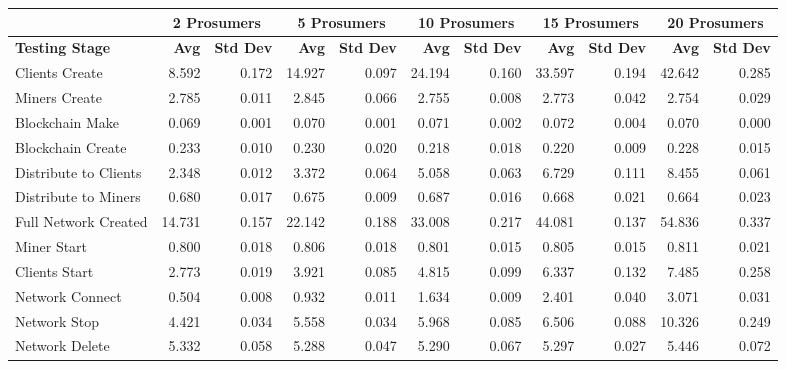 \begin{tabular}{ l  r  r  r  r  r  r  r  r  r  r  } \hline

	&	\multicolumn{2}{c}{\textbf{2 Prosumers}}  	&	\multicolumn{2}{c}{\textbf{5 Prosumers}}	&	 \multicolumn{2}{c}{\textbf{10 Prosumers}}	&	\multicolumn{2}{c}{\textbf{15 Prosumers}} 	&	 \multicolumn{2}{c}{\textbf{20 Prosumers}}		\\ \hline

\textbf{Testing Stage}	&	\textbf{Avg} 	&	\textbf{Std Dev} 	&	\textbf{Avg} 	&	\textbf{Std Dev} 	&	\textbf{Avg} 	&	\textbf{Std Dev } 	&	\textbf{Avg} 	&	\textbf{Std Dev} 	&	\textbf{Avg} 	&	\textbf{Std Dev} 	\\ \hline


Clients Create	&	8.592 	&	0.172 	&	14.927 	&	0.097 	&	24.194 	&	0.160 	&	33.597 	&	0.194 	&	42.642 	&	0.285 	\\ \hline
Miners Create 	&	2.785 	&	0.011 	&	2.845 	&	0.066 	&	2.755 	&	0.008 	&	2.773 	&	0.042 	&	2.754 	&	0.029 	\\ \hline
Blockchain Make	&	0.069 	&	0.001 	&	0.070 	&	0.001 	&	0.071 	&	0.002 	&	0.072 	&	0.004 	&	0.070 	&	0.000 	\\ \hline
Blockchain Create	&	0.233 	&	0.010 	&	0.230 	&	0.020 	&	0.218 	&	0.018 	&	0.220 	&	0.009 	&	0.228 	&	0.015 	\\ \hline
Distribute to Clients	&	2.348 	&	0.012 	&	3.372 	&	0.064 	&	5.058 	&	0.063 	&	6.729 	&	0.111 	&	8.455 	&	0.061 	\\ \hline
Distribute to Miners	&	0.680 	&	0.017 	&	0.675 	&	0.009 	&	0.687 	&	0.016 	&	0.668 	&	0.021 	&	0.664 	&	0.023 	\\ \hline
Full Network Created	&	14.731 	&	0.157 	&	22.142 	&	0.188 	&	33.008 	&	0.217 	&	44.081 	&	0.137 	&	54.836 	&	0.337 	\\ \hline
Miner Start	&	0.800 	&	0.018 	&	0.806 	&	0.018 	&	0.801 	&	0.015 	&	0.805 	&	0.015 	&	0.811 	&	0.021 	\\ \hline
Clients Start	&	2.773 	&	0.019 	&	3.921 	&	0.085 	&	4.815 	&	0.099 	&	6.337 	&	0.132 	&	7.485 	&	0.258 	\\ \hline
Network Connect	&	0.504 	&	0.008 	&	0.932 	&	0.011 	&	1.634 	&	0.009 	&	2.401 	&	0.040 	&	3.071 	&	0.031 	\\ \hline
Network Stop	&	4.421 	&	0.034 	&	5.558 	&	0.034 	&	5.968 	&	0.085 	&	6.506 	&	0.088 	&	10.326 	&	0.249 	\\ \hline
Network Delete	&	5.332 	&	0.058 	&	5.288 	&	0.047 	&	5.290 	&	0.067 	&	5.297 	&	0.027 	&	5.446 	&	0.072 	\\ \hline
\end{tabular} 